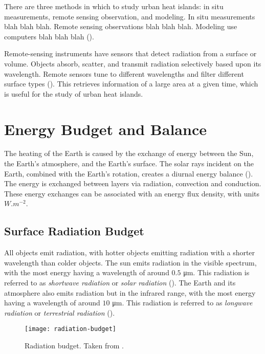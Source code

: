 	There are three methods in which to study urban heat islands:
	in situ measurements,
	remote sensing observation,
	and modeling.
	In situ measurements blah blah blah.
	Remote sensing observations blah blah blah.
	Modeling use computers blah blah blah (\cite{Bahi2020}).
	
	Remote-sensing instruments have sensors that detect radiation from a surface or volume.
	Objects absorb, scatter, and transmit radiation selectively based upon its wavelength.
	Remote sensors tune to different wavelengths and filter different surface types (\cite{Oke2017urban}).
	This retrieves information of a large area at a given time, which is useful for the study of urban heat islands.

\section{Energy Budget and Balance}

	The heating of the Earth is caused by the exchange of energy between the Sun, the Earth's atmosphere, and the Earth's surface.
	The solar rays incident on the Earth, combined with the Earth's rotation, creates a diurnal energy balance (\cite{Wallace2006}).
	The energy is exchanged between layers via radiation, convection and
	conduction.
	These energy exchanges can be associated with an energy flux density, with units $\si{W.m^{-2}}$.
	
	\subsection{Surface Radiation Budget}
		All objects emit radiation, with hotter objects emitting radiation with a shorter wavelength than colder objects.
		The sun emits radiation in the visible spectrum, with the most energy having a wavelength of around $0.5$ \si{\micro m}.
		This radiation is referred to as \textit{shortwave radiation} or \textit{solar radiation} (\cite{Oke2017urban}).
		The Earth and its atmosphere also emits radiation but in the infrared range, with the most energy having a wavelength of around $10$ \si{\micro m}.
		This radiation is referred to as \textit{longwave radiation} or \textit{terrestrial radiation} (\cite{Oke2017urban}).
		
		\begin{figure}	
			\centering
			\texttt{[image: radiation-budget]}
			\caption{Radiation budget. Taken from \textcite{Oke1982}.}
			\label{fig:radiation-budget}
		\end{figure}
	
